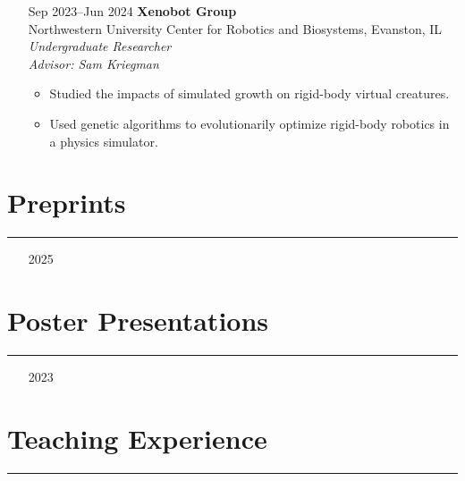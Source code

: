 \documentclass{article}
\begin{document}
\begin{itemize}[leftmargin=1.5in]
    \item[Sep 2023–Jun 2024] \textbf{Xenobot Group}\\
     Northwestern University Center for Robotics and Biosystems, Evanston, IL\\
    \textit{Undergraduate Researcher}\\
    \textit{Advisor: Sam Kriegman}
    \begin{itemize}
        \item Studied the impacts of simulated growth on rigid-body virtual creatures.
        \item Used genetic algorithms to evolutionarily optimize rigid-body robotics in a physics simulator.
    \end{itemize}
\end{itemize}

\section*{Preprints}
\hrule
\vspace{10pt}

\begin{itemize}[leftmargin=1.5in]
    \item[2025] 
\end{itemize}

\section*{Poster Presentations}
\hrule
\vspace{10pt}

\begin{itemize}[leftmargin=1.5in]
    \item[2023] 
\end{itemize}

\section*{Teaching Experience}
\hrule
\vspace{10pt}
\end{document}
